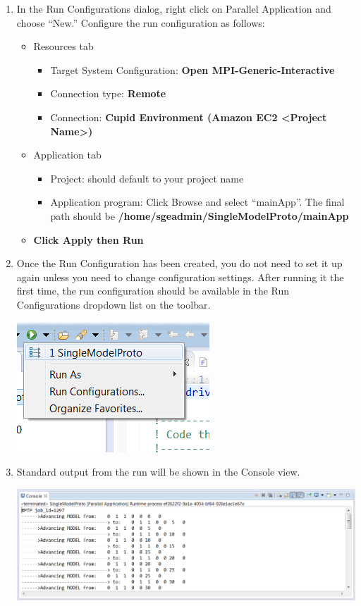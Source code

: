 \documentclass[oneside,11pt]{memoir}
\begin{document}
\begin{enumerate}
\item In the Run Configurations dialog, right click on Parallel Application and choose ``New.''  Configure the run configuration as follows:

\begin{itemize}
\item Resources tab
	\begin{itemize}
	\item Target System Configuration: \textbf{Open MPI-Generic-Interactive}
	\item Connection type: \textbf{Remote}
	\item Connection: \textbf{Cupid Environment (Amazon EC2  <Project Name>)}
	\end{itemize}
\item Application tab
	\begin{itemize}
	\item Project: should default to your project name
	\item Application program: Click Browse and select ``mainApp''.  The final path should be \textbf{/home/sgeadmin/SingleModelProto/mainApp}
	\end{itemize}
\item \textbf{Click Apply then Run}
\end{itemize}

\item Once the Run Configuration has been created, you do not need to set it up again unless you need to change configuration settings.  After running it the first time, the run configuration should be available in the Run Configurations dropdown list on the toolbar.

\parbox{\linewidth}{\centering
  \includegraphics{figs/cloudrun_fig4.png}
}

\item Standard output from the run will be shown in the Console view.

\parbox{\linewidth}{\centering
  \includegraphics[width=\textwidth]{figs/cloudrun_fig5.png}
}

\end{enumerate}
\end{document}
